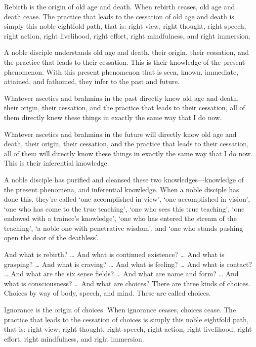\documentclass[12pt,openany]{book}%
\begin{document}
Rebirth is the origin of old age and death. When rebirth ceases, old age and death cease. The practice that leads to the cessation of old age and death is simply this noble eightfold path, that is: right view, right thought, right speech, right action, right livelihood, right effort, right mindfulness, and right immersion. 

A noble disciple understands old age and death, their origin, their cessation, and the practice that leads to their cessation. This is their knowledge of the present phenomenon. With this present phenomenon that is seen, known, immediate, attained, and fathomed, they infer to the past and future. 

Whatever ascetics and brahmins in the past directly knew old age and death, their origin, their cessation, and the practice that leads to their cessation, all of them directly knew these things in exactly the same way that I do now. 

Whatever ascetics and brahmins in the future will directly know old age and death, their origin, their cessation, and the practice that leads to their cessation, all of them will directly know these things in exactly the same way that I do now. This is their inferential knowledge. 

A noble disciple has purified and cleansed these two knowledges—knowledge of the present phenomena, and inferential knowledge. When a noble disciple has done this, they’re called ‘one accomplished in view’, ‘one accomplished in vision’, ‘one who has come to the true teaching’, ‘one who sees this true teaching’, ‘one endowed with a trainee’s knowledge’, ‘one who has entered the stream of the teaching’, ‘a noble one with penetrative wisdom’, and ‘one who stands pushing open the door of the deathless’. 

And what is rebirth? … And what is continued existence? … And what is grasping? … And what is craving? … And what is feeling? … And what is contact? … And what are the six sense fields? … And what are name and form? … And what is consciousness? … And what are choices? There are three kinds of choices. Choices by way of body, speech, and mind. These are called choices. 

Ignorance is the origin of choices. When ignorance ceases, choices cease. The practice that leads to the cessation of choices is simply this noble eightfold path, that is: right view, right thought, right speech, right action, right livelihood, right effort, right mindfulness, and right immersion. 
\end{document}
